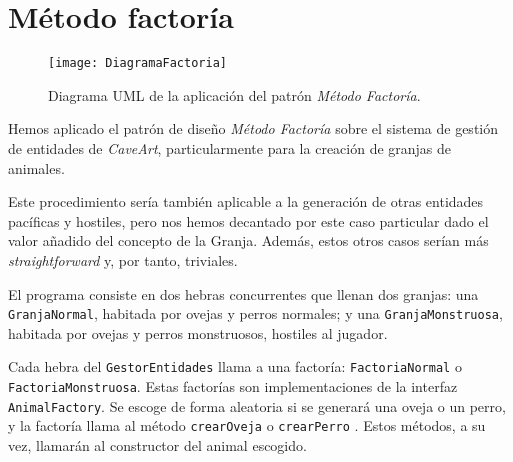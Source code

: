 \section{Método factoría}

\begin{figure}[ht!]
\begin{center}
	\texttt{[image: DiagramaFactoria]}
\end{center}
\caption{Diagrama UML de la aplicación del patrón \textit{Método Factoría}.}
\end{figure}

Hemos aplicado el patrón de diseño \textit{Método Factoría} sobre el sistema de gestión de entidades de \textit{CaveArt}, particularmente para la creación de granjas de animales.

Este procedimiento sería también aplicable a la generación de otras entidades pacíficas y hostiles, pero nos hemos decantado por este caso particular dado el valor añadido del concepto de la Granja. Además, estos otros casos serían más \textit{straightforward} y, por tanto, triviales.

El programa consiste en dos hebras concurrentes que llenan dos granjas: una \texttt{GranjaNormal}, habitada por ovejas y perros normales; y una \texttt{GranjaMonstruosa}, habitada por ovejas y perros monstruosos, hostiles al jugador.

Cada hebra del \texttt{GestorEntidades} llama a una factoría: \texttt{FactoriaNormal} o \texttt{FactoriaMonstruosa}. Estas factorías son implementaciones de la interfaz \texttt{AnimalFactory}. Se escoge de forma aleatoria si se generará una oveja o un perro, y la factoría llama al método \texttt{crearOveja} o \texttt{crearPerro} . Estos métodos, a su vez, llamarán al constructor del animal escogido.
